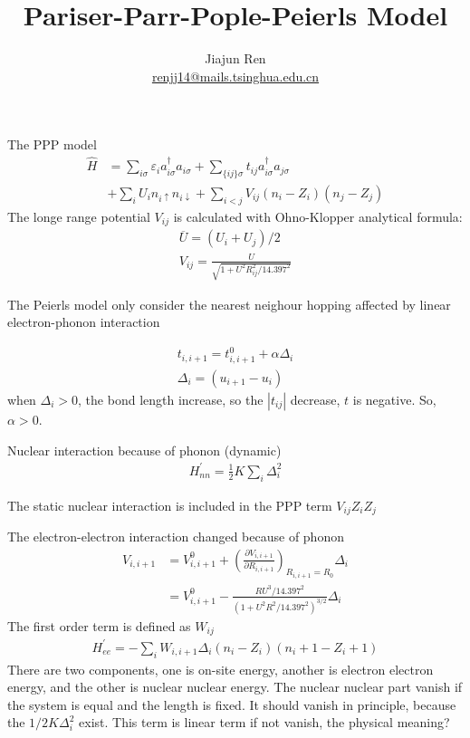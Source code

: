 \documentclass[a4paper,11pt]{article}
\author{Jiajun Ren \\ \href{mailto:renjj14@mails.tsinghua.edu.cn}{renjj14@mails.tsinghua.edu.cn}}
\title{Pariser-Parr-Pople-Peierls Model}
\begin{document}
	\maketitle
    The PPP model
    \begin{align}
        \hat{H} & = \sum_{{i}\sigma} \varepsilon_i a_{i\sigma}^\dagger a_{i\sigma}
        +  \sum_{\{ij\}\sigma} t_{ij} a_{i\sigma}^\dagger a_{j\sigma} \nonumber \\
        & + \sum_{i} U_i n_{i\uparrow} n_{i\downarrow}  
            + \sum_{i<j} V_{ij} (n_i-Z_i) (n_j-Z_j)
    \end{align}
    The longe range potential $V_{ij}$ is calculated with Ohno-Klopper analytical formula:
    \begin{gather}
        \overline{U}=(U_i+U_j)/2 \\
        V_{ij}= \frac{U}{\sqrt{1+U^2 R_{ij}^2/14.397^2}}
    \end{gather}

    The Peierls model only consider the nearest neighour hopping affected by
    linear electron-phonon interaction

    \begin{gather}
        t_{i,i+1}=t_{i,i+1}^0+\alpha \Delta_i \\
        \Delta_i=(u_{i+1}-u_i)
    \end{gather}
    when $\Delta_i>0$, the bond length increase, so the $|t_{ij}|$ decrease, $t$
    is negative. So, $\alpha>0$.

    Nuclear interaction because of phonon (dynamic) 
    \begin{gather}
        H_{nn}^{'}= \frac{1}{2} K \sum_{i} \Delta_i^2
    \end{gather}

    The static nuclear interaction is included in the PPP term $ V_{ij} Z_i Z_j $
    
    The electron-electron interaction changed because of phonon
    \begin{align}
        V_{i,i+1} & =V_{i,i+1}^0+ %
        (\frac{\partial{V_{i,i+1}}}{\partial{R_{i,i+1}}})_{R_{i,i+1}=R_0} %
        \Delta_i \\ \nonumber
        &  = V_{i,i+1}^0-\frac{RU^3/14.397^2}{(1+U^2R^2/14.397^2)^{3/2}} \Delta_i
    \end{align}
    The first order term is defined as $W_{ij}$
    \begin{gather}
        H_{ee}^{'}=-\sum_{i} W_{i,i+1} \Delta_i (n_i-Z_i) (n_i+1-Z_i+1)
    \end{gather}
    There are two components, one is on-site energy, another is electron
    electron energy, and the other is nuclear nuclear energy.  The nuclear
    nuclear part vanish if the system is equal and the length is fixed. It
    should vanish in principle, because the $1/2K \Delta_i^2$ exist. This term
    is linear term if not vanish, the physical meaning?
 
\end{document}
